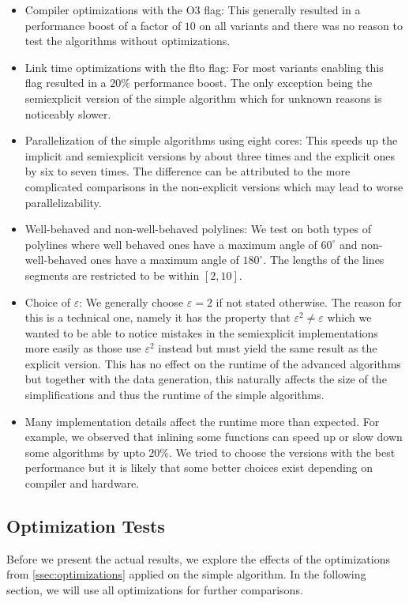 \begin{itemize}
  \item Compiler optimizations with the O3 flag: This generally resulted in a performance boost of a factor of \(10\) on all variants and there was no reason to test the algorithms without optimizations.
	\item Link time optimizations with the flto flag: For most variants enabling this flag resulted in a \(20\%\) performance boost. The only exception being the semiexplicit version of the simple algorithm which for unknown reasons is noticeably slower.
	\item Parallelization of the simple algorithms using eight cores: This speeds up the implicit and semiexplicit versions by about three times and the explicit ones by six to seven times. The difference can be attributed to the more complicated comparisons in the non-explicit versions which may lead to worse parallelizability. 
	\item Well-behaved and non-well-behaved polylines: We test on both types of polylines where well behaved ones have a maximum angle of \(60^\circ\) and non-well-behaved ones have a maximum angle of \(180^\circ\). The lengths of the lines segments are restricted to be within \([2, 10]\). 
	\item Choice of \(\varepsilon\): We generally choose \(\varepsilon = 2\) if not stated otherwise. The reason for this is a technical one, namely it has the property that \(\varepsilon^2 \neq \varepsilon\) which we wanted to be able to notice mistakes in the semiexplicit implementations more easily as those use \(\varepsilon^2\) instead but must yield the same result as the explicit version. This has no effect on the runtime of the advanced algorithms but together with the data generation, this naturally affects the size of the simplifications and thus the runtime of the simple algorithms.
	\item Many implementation details affect the runtime more than expected. For example, we observed that inlining some functions can speed up or slow down some algorithms by upto \(20\%\). We tried to choose the versions with the best performance but it is likely that some better choices exist depending on compiler and hardware. 
\end{itemize}

\subsection{Optimization Tests}
Before we present the actual results, we explore the effects of the optimizations from \cref{ssec:optimizations} applied on the simple algorithm. In the following section, we will use all optimizations for further comparisons.


